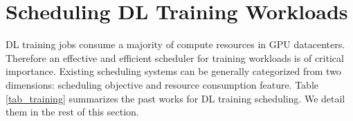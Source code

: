 \section{Scheduling DL Training Workloads}
\label{sec_training}

DL training jobs consume a majority of compute resources in GPU datacenters. Therefore an effective and efficient scheduler for training workloads is of critical importance. Existing scheduling systems can be generally categorized from two dimensions: scheduling objective and resource consumption feature. Table \ref{tab_training} summarizes the past works for DL training scheduling. We detail them in the rest of this section.

\begin{table}[t]
    \centering
    \caption{\textbf{Summary of schedulers for DL training workloads in GPU Datacenters}.
    }
    \vspace{-10pt}
    \resizebox{\textwidth}{!}{

}
\end{table}
